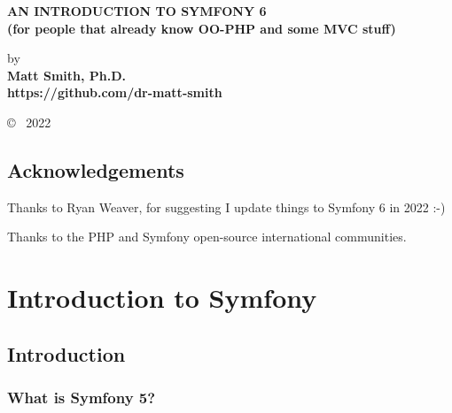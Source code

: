 \documentclass[a4paperpaper,openright]{book}
\date{}
\begin{document}
\begin{titlepage}
    \begin{center}
    
        \vspace*{1cm}
        

       \large{ \textbf{ \uppercase{An Introduction to Symfony 6}\\(for people that already know OO-PHP and some MVC stuff)}}
        
        \vspace{1.5cm}

        by\\
        \textbf{
        Matt Smith, Ph.D.\\https://github.com/dr-matt-smith
        }

       

        
        
        \vfill
  
            \copyright ~ 2022

     \end{center}
    \thispagestyle{empty}
\end{titlepage}

\newpage
\thispagestyle{empty}
\mbox{}

\frontmatter

\chapter{Acknowledgements}

Thanks to Ryan Weaver, for suggesting I update things to Symfony 6 in
2022 :-)

Thanks to the PHP and Symfony open-source international communities.

\tableofcontents

\mainmatter

\part{Introduction to Symfony}

\hypertarget{introduction}{%
\chapter{Introduction}\label{introduction}}

\hypertarget{what-is-symfony-5}{%
\section{What is Symfony 5?}\label{what-is-symfony-5}}
\end{document}
